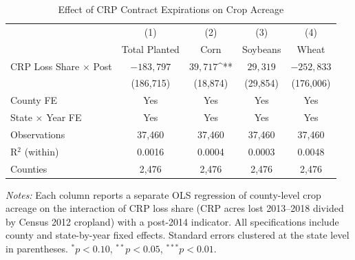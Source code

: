 \begin{table}[t]
\centering
\caption{Effect of CRP Contract Expirations on Crop Acreage}
\label{tab:main}
\begin{tabular}{lcccc}
\hline\hline
 & (1) & (2) & (3) & (4) \\
 & Total Planted & Corn & Soybeans & Wheat \\
\hline
CRP Loss Share $\times$ Post & $-183,797$ & $39,717$^{**} & $29,319$ & $-252,833$ \\
 & (186,715) & (18,874) & (29,854) & (176,006) \\
\hline
County FE & Yes & Yes & Yes & Yes \\
State $\times$ Year FE & Yes & Yes & Yes & Yes \\
Observations & 37,460 & 37,460 & 37,460 & 37,460 \\
R$^2$ (within) & 0.0016 & 0.0004 & 0.0003 & 0.0048 \\
Counties & 2,476 & 2,476 & 2,476 & 2,476 \\
\hline\hline
\end{tabular}
\begin{tablenotes}[flushleft]\small
\item \textit{Notes:} Each column reports a separate OLS regression of county-level crop acreage on the interaction of CRP loss share (CRP acres lost 2013--2018 divided by Census 2012 cropland) with a post-2014 indicator. All specifications include county and state-by-year fixed effects. Standard errors clustered at the state level in parentheses. $^{*}p<0.10$, $^{**}p<0.05$, $^{***}p<0.01$.
\end{tablenotes}
\end{table}

